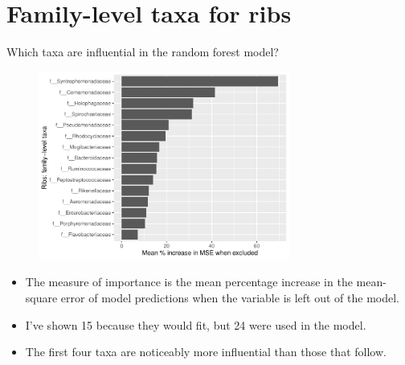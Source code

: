 \documentclass{beamer}
\begin{document}
\section[Ribs, family-level]{Family-level taxa for ribs}

\begin{frame}{Which taxa are influential in the random forest model?}

  \begin{center}
    \begin{figure}
      \includegraphics[width=3.25in]{use_families/w_ribs/families_PercIncMSE_barchart}
    \end{figure}
  \end{center}
  \vspace{-0.1in}
  {\scriptsize
  \begin{itemize}
  \item The measure of importance is the mean percentage increase in the
    mean-square error of model predictions when the variable is left out of the
    model. 
  \item I've shown 15 because they would fit, but 24 were used in the model.
  \item The first four taxa are noticeably more influential than those that
  follow.
  \end{itemize}
  }

\end{frame}
\end{document}
